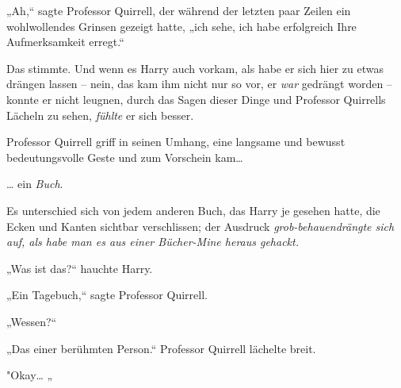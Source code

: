 „Ah,“ sagte Professor Quirrell, der während der letzten paar Zeilen ein wohlwollendes Grinsen gezeigt hatte, „ich sehe, ich habe erfolgreich Ihre Aufmerksamkeit erregt.“

Das stimmte. Und wenn es Harry auch vorkam, als habe er sich hier zu etwas drängen lassen -- nein, das kam ihm nicht nur so vor, er \emph{war} gedrängt worden -- konnte er nicht leugnen, durch das Sagen dieser Dinge und Professor Quirrells Lächeln zu sehen, \emph{fühlte} er sich besser.

Professor Quirrell griff in seinen Umhang, eine langsame und bewusst bedeutungsvolle Geste und zum Vorschein kam…

… ein \emph{Buch}.

Es unterschied sich von jedem anderen Buch, das Harry je gesehen hatte, die Ecken und Kanten sichtbar verschlissen; der Ausdruck \emph{grob-behauendrängte sich auf, als habe man es aus einer Bücher-Mine heraus gehackt.}

„Was ist das?“ hauchte Harry.

„Ein Tagebuch,“ sagte Professor Quirrell.

„Wessen?“

„Das einer berühmten Person.“ Professor Quirrell lächelte breit.

"Okay… „

